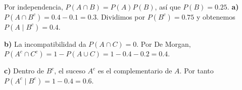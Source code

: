 Por independencia, $P(A\cap B)=P(A)P(B)$, así que $P(B)=0.25$.
\textbf{a)} $P(A\cap B^c)=0.4-0.1=0.3$. Dividimos por
$P(B^c)=0.75$ y obtenemos $\boxed{P(A\mid B^c)=0.4}$.

\textbf{b)} La incompatibilidad da $P(A\cap C)=0$.
Por De Morgan, $P(A^c\cap C^c)=1-P(A\cup C)=1-0.4-0.2=\boxed{0.4}$.

\textbf{c)} Dentro de $B^c$, el suceso $A^c$ es el complementario
de $A$. Por tanto $P(A^c\mid B^c)=1-0.4=\boxed{0.6}$.
